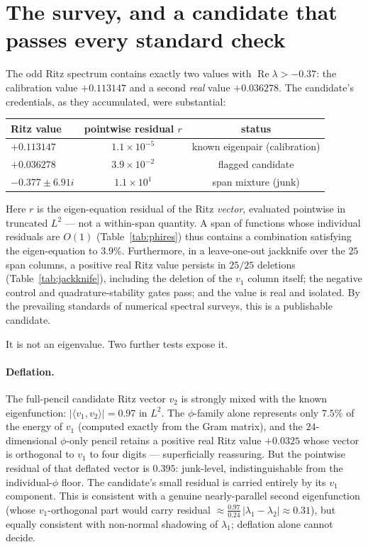 \documentclass[11pt]{article}
\theoremstyle{plain}
\theoremstyle{remark}
\begin{document}
\section{The survey, and a candidate that passes every standard
check}\label{sec:survey}
The odd Ritz spectrum contains exactly two values with
$\operatorname{Re}\lambda > -0.37$: the calibration value
$+0.113147$ and a second \emph{real} value $+0.036278$. The candidate's
credentials, as they accumulated, were substantial:
\begin{center}
\begin{tabular}{lcc}
\toprule
Ritz value & pointwise residual $r$ & status \\
\midrule
$+0.113147$ & $1.1\times 10^{-5}$ & known eigenpair (calibration) \\
$+0.036278$ & $3.9\times 10^{-2}$ & flagged candidate \\
$-0.377 \pm 6.91 i$ & $1.1\times 10^{1}$ & span mixture (junk) \\
\bottomrule
\end{tabular}
\end{center}
Here $r$ is the eigen-equation residual of the Ritz \emph{vector},
evaluated pointwise in truncated $L^2$ --- not a within-span quantity. A
span of functions whose individual residuals are $O(1)$
(Table~\ref{tab:phires}) thus contains a combination satisfying the
eigen-equation to $3.9\%$. Furthermore, in a leave-one-out jackknife
over the $25$ span columns, a positive real Ritz value persists in
$25/25$ deletions (Table~\ref{tab:jackknife}), including the deletion of
the $v_1$ column itself; the negative control and quadrature-stability
gates pass; and the value is real and isolated. By the prevailing
standards of numerical spectral surveys, this is a publishable
candidate.

It is not an eigenvalue. Two further tests expose it.

\paragraph{Deflation.} The full-pencil candidate Ritz vector $v_2$ is
strongly mixed with the known eigenfunction:
$|\langle v_1, v_2\rangle| = 0.97$ in $L^2$. The $\phi$-family alone
represents only $7.5\%$ of the energy of $v_1$ (computed exactly from
the Gram matrix), and the $24$-dimensional $\phi$-only pencil retains a
positive real Ritz value $+0.0325$ whose vector is orthogonal to $v_1$
to four digits --- superficially reassuring. But the pointwise residual
of that deflated vector is $0.395$: junk-level, indistinguishable from
the individual-$\phi$ floor. The candidate's small residual is carried
entirely by its $v_1$ component. This is consistent with a genuine
nearly-parallel second eigenfunction (whose $v_1$-orthogonal part would
carry residual
$\approx \tfrac{0.97}{0.24}\,|\lambda_1-\lambda_2| \approx 0.31$), but
equally consistent with non-normal shadowing of $\lambda_1$; deflation
alone cannot decide.
\end{document}
